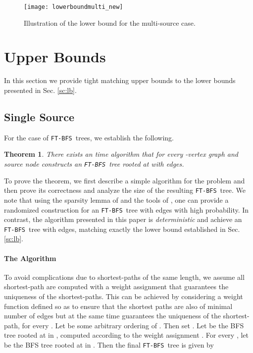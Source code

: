 \documentclass[12pt]{article}
\newtheorem{theorem}{Theorem}[section]
\def\FTBFS{\mbox{\tt FT-BFS}}
\begin{document}
\begin{figure}[h!]
\begin{center}
\texttt{[image: lowerboundmulti\_new]}
\caption{\label{fig:lowerboundmulti}
Illustration of the lower bound for the multi-source case.}
\end{center}
\end{figure}



\section{Upper Bounds}
\label{sec:upper}
In this section we provide tight matching upper bounds to the lower bounds
presented in Sec. \ref{sc:lb}.

\subsection{Single Source}
\label{subsec:1edge_alg}
For the case of \FTBFS\ trees, we establish the following.
\begin{theorem}
There exists an  time algorithm that for every -vertex graph 
and source node  constructs an \FTBFS\ tree rooted at  with
 edges.
\end{theorem}
To prove the theorem, we first describe a simple algorithm for the problem
and then prove its correctness and analyze the size
of the resulting \FTBFS\ tree.
We note that using the sparsity lemma of \cite{RTREP05} and the tools of
\cite{GW12}, one can provide a randomized construction for an \FTBFS\ tree
with  edges with high probability.
In contrast, the algorithm presented in this paper is
\emph{deterministic} and achieve an \FTBFS\ tree with  edges,
matching exactly the lower bound established in Sec. \ref{sc:lb}.

\paragraph{The Algorithm}
To avoid complications due to shortest-paths of the same length,
we assume all shortest-path are computed with a weight assignment 
that guarantees the uniqueness of the shortest-paths. This can be achieved
by considering
a weight function  defined so as to ensure that the shortest paths are also
of minimal number of edges but at the same time guarantees the uniqueness
of the  shortest-path, for every . Let  be some arbitrary ordering of . Then set .
Let  be the BFS tree rooted at  in , computed according
to the weight assignment . For every , let  be the
BFS tree rooted at  in .
Then the final \FTBFS\ tree is given by
\end{document}
